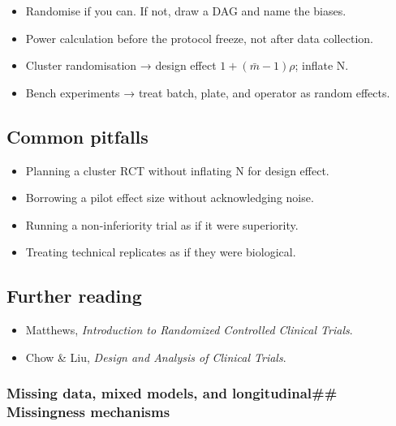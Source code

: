 \documentclass[
]{article}
\providecommand{\tightlist}{%
  \setlength{\itemsep}{0pt}\setlength{\parskip}{0pt}}
\begin{document}
\begin{itemize}
\tightlist
\item
  Randomise if you can. If not, draw a DAG and name the biases.
\item
  Power calculation before the protocol freeze, not after data
  collection.
\item
  Cluster randomisation → design effect \(1 + (\bar m - 1)\rho\);
  inflate N.
\item
  Bench experiments → treat batch, plate, and operator as random
  effects.
\end{itemize}

\subsection{Common pitfalls}\label{common-pitfalls-8}

\begin{itemize}
\tightlist
\item
  Planning a cluster RCT without inflating N for design effect.
\item
  Borrowing a pilot effect size without acknowledging noise.
\item
  Running a non-inferiority trial as if it were superiority.
\item
  Treating technical replicates as if they were biological.
\end{itemize}

\subsection{Further reading}\label{further-reading-8}

\begin{itemize}
\tightlist
\item
  Matthews, \emph{Introduction to Randomized Controlled Clinical
  Trials}.
\item
  Chow \& Liu, \emph{Design and Analysis of Clinical Trials}.
\end{itemize}

\subsubsection{Missing data, mixed models, and longitudinal\#\#
Missingness
mechanisms}\label{missing-data-mixed-models-and-longitudinal-missingness-mechanisms}
\end{document}
